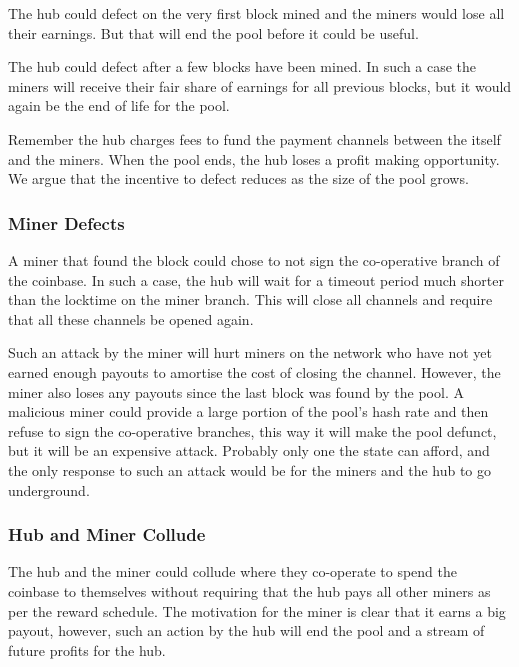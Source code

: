 \documentclass{article}
\begin{document}
The hub could defect on the very first block mined and the miners
would lose all their earnings. But that will end the pool before it
could be useful.

The hub could defect after a few blocks have been mined. In such a
case the miners will receive their fair share of earnings for all
previous blocks, but it would again be the end of life for the pool.

Remember the hub charges fees to fund the payment channels between the
itself and the miners. When the pool ends, the hub loses a profit
making opportunity. We argue that the incentive to defect reduces as
the size of the pool grows.

\subsubsection{Miner Defects}\label{ref:miner-defects}

A miner that found the block could chose to not sign the co-operative
branch of the coinbase. In such a case, the hub will wait for a
timeout period much shorter than the locktime on the miner
branch. This will close all channels and require that all these
channels be opened again.

Such an attack by the miner will hurt miners on the network who have
not yet earned enough payouts to amortise the cost of closing the
channel. However, the miner also loses any payouts since the last
block was found by the pool. A malicious miner could provide a large
portion of the pool's hash rate and then refuse to sign the
co-operative branches, this way it will make the pool defunct, but it
will be an expensive attack. Probably only one the state can afford,
and the only response to such an attack would be for the miners and
the hub to go underground.

\subsubsection{Hub and Miner Collude}\label{ref:collusion}

The hub and the miner could collude where they co-operate to spend the
coinbase to themselves without requiring that the hub pays all other
miners as per the reward schedule. The motivation for the miner is
clear that it earns a big payout, however, such an action by the hub
will end the pool and a stream of future profits for the hub.

\end{document}
